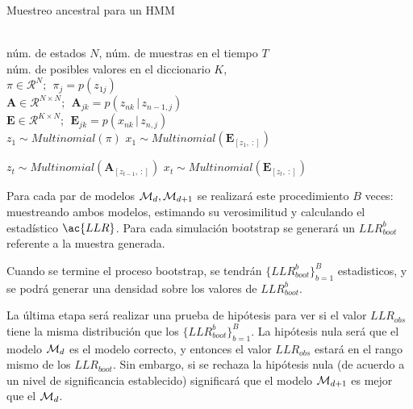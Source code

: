 \begin{algorithm}[tp]
   \caption{Muestreo ancestral para un HMM}
   \label{alg:ancsamp}
\begin{algorithmic}
    \\
   núm. de estados $N$, núm. de muestras en el tiempo $T$ \\
   núm. de posibles valores en el diccionario $K$, \\
   $ \pi \in \mathcal{R}^{N}; ~~ \pi_j = p(z_{1j})$ \\
   $ \mathbf{A} \in \mathcal{R}^{N \times N}; ~~
   \mathbf{A}_{jk} = p(z_{nk} \,|\, z_{n-1, j})$ \\

   $ \mathbf{E} \in \mathcal{R}^{K \times N}; ~~
   \mathbf{E}_{jk} = p(x_{nk} \,|\, z_{n, j})$\\  
   \STATE
   \STATE $z_1 \sim Multinomial(\pi)$   
   \STATE $x_1 \sim Multinomial(\mathbf{E}_{[z_1,~:]})$

    \STATE $z_t \sim Multinomial(\mathbf{A}_{[z_{t-1},~:]})$ 
    \STATE $x_t \sim Multinomial(\mathbf{E}_{[z_t,~:]})$
   \ENDFOR   
\end{algorithmic}
\end{algorithm}

Para cada par de modelos $\mathcal{M}_d, \mathcal{M}_{d+1}$ se realizará este procedimiento $B$ veces: muestreando ambos modelos, estimando su verosimilitud y calculando el estadístico $\ac{LLR}$. Para cada simulación bootstrap se generará un $LLR_{boot}^b$ referente a la muestra generada. 

Cuando se termine el proceso bootstrap, se tendrán $\lbrace LLR_{boot}^b \rbrace_{b=1}^B$ estadisticos, y se podrá generar una densidad sobre los valores de $LLR_{boot}^b$. 

La última etapa será realizar una prueba de hipótesis para ver si el valor $LLR_{obs}$ tiene la misma distribución que los $\lbrace LLR_{boot}^b \rbrace_{b=1}^B$. La hipótesis nula será que el modelo $\mathcal{M}_d$ es el modelo correcto, y entonces el valor $LLR_{obs}$ estará en el rango mismo de los $LLR_{boot}$. Sin embargo, si se rechaza la hipótesis nula (de acuerdo a un nivel de significancia establecido) significará que el modelo $\mathcal{M}_{d+1}$ es mejor que el $\mathcal{M}_{d}$.